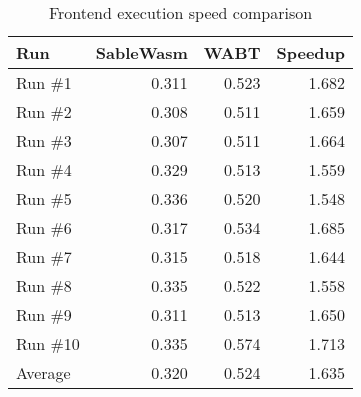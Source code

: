 \begin{table}[htbp]
  \centering
    \begin{tabular}{lrrr}
    \toprule
    \textbf{Run} & \multicolumn{1}{l}{\textbf{SableWasm}} & \multicolumn{1}{l}{\textbf{WABT}} & \multicolumn{1}{l}{\textbf{Speedup}} \\
    \midrule
    \rowcolor[rgb]{ .851,  .851,  .851} Run \#1 & 0.311 & 0.523 & 1.682 \\
    Run \#2 & 0.308 & 0.511 & 1.659 \\
    \rowcolor[rgb]{ .851,  .851,  .851} Run \#3 & 0.307 & 0.511 & 1.664 \\
    Run \#4 & 0.329 & 0.513 & 1.559 \\
    \rowcolor[rgb]{ .851,  .851,  .851} Run \#5 & 0.336 & 0.520 & 1.548 \\
    Run \#6 & 0.317 & 0.534 & 1.685 \\
    \rowcolor[rgb]{ .851,  .851,  .851} Run \#7 & 0.315 & 0.518 & 1.644 \\
    Run \#8 & 0.335 & 0.522 & 1.558 \\
    \rowcolor[rgb]{ .851,  .851,  .851} Run \#9 & 0.311 & 0.513 & 1.650 \\
    Run \#10 & 0.335 & 0.574 & 1.713 \\
    \rowcolor[rgb]{ .851,  .851,  .851} Average & 0.320 & 0.524 & 1.635 \\
    \bottomrule
    \end{tabular}%
  \caption{Frontend execution speed comparison}
  \label{tab:frontend-benmark-time}%
\end{table}%
